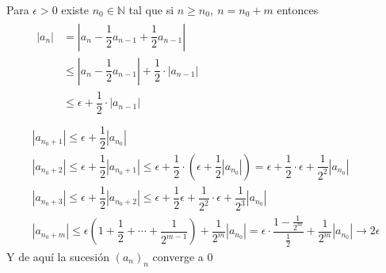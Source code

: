\begin{enumerate}[label=\color{red}\textbf{\arabic*)}, leftmargin=*]
Para $\epsilon>0$ existe $n_0\in\mathbb{N}$ tal que si $n\ge n_0,\:n=n_0+m$ entonces
\[ \begin{array}{c}
	\begin{aligned}
	|a_n|&=\left|a_n-\dfrac{1}{2}a_{n-1}+\dfrac{1}{2}a_{n-1}\right|\\
	&\le\left|a_n-\dfrac{1}{2}a_{n-1}\right|+\dfrac{1}{2}\cdot\left|a_{n-1}\right|\\
	&\le\epsilon+\dfrac{1}{2}\cdot\left|a_{n-1}\right|\\
\end{aligned}\\
\left|a_{n_0+1}\right|\le\epsilon+\dfrac{1}{2}\left|a_{n_0}\right|\\
\left|a_{n_0+2}\right|\le\epsilon+\dfrac{1}{2}\left|a_{n_0+1}\right|\le\epsilon+\dfrac{1}{2}\cdot\left(\epsilon+\dfrac{1}{2}\left|a_{n_0}\right|\right)=\epsilon+\dfrac{1}{2}\cdot\epsilon+\dfrac{1}{2^2}\left|a_{n_0}\right|\\
\left|a_{n_0+3}\right|\le\epsilon+\dfrac{1}{2}\left|a_{n_0+2}\right|\le\epsilon+\dfrac{1}{2}\epsilon+\dfrac{1}{2^2}\cdot\epsilon+\dfrac{1}{2^3}\left|a_{n_0}\right|\\
\left|a_{n_0+m}\right|\le\epsilon\left(1+\dfrac{1}{2}+\cdots+\dfrac{1}{2^{m-1}}\right)+\dfrac{1}{2^m}\left|a_{n_0}\right|=\epsilon\cdot\dfrac{1-\frac{1}{2^m}}{\frac{1}{2}}+\dfrac{1}{2^m}\left|a_{n_0}\right|\longrightarrow2\epsilon
\end{array} \]
Y de aquí la sucesión $(a_n)_n$ converge a 0
\end{enumerate}
